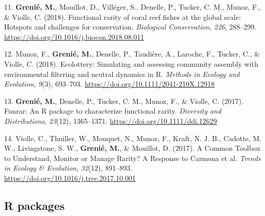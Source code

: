 \documentclass[10pt,a4paper,]{article}
\begin{document}
\leavevmode{}%
11. \textbf{Grenié, M.}, Mouillot, D., Villéger, S., Denelle, P.,
Tucker, C. M., Munoz, F., \& Violle, C. (2018). Functional rarity of
coral reef fishes at the global scale: Hotspots and challenges for
conservation. \emph{Biological Conservation}, \emph{226}, 288--299.
\url{https://doi.org/10.1016/j.biocon.2018.08.011}

\leavevmode{}%
12. Munoz, F., \textbf{Grenié, M.}, Denelle, P., Taudière, A., Laroche,
F., Tucker, C., \& Violle, C. (2018). Ecolottery: Simulating and
assessing community assembly with environmental filtering and neutral
dynamics in R. \emph{Methods in Ecology and Evolution}, \emph{9}(3),
693--703. \url{https://doi.org/10.1111/2041-210X.12918}

\leavevmode{}%
13. \textbf{Grenié, M.}, Denelle, P., Tucker, C. M., Munoz, F., \&
Violle, C. (2017). Funrar: An R package to characterize functional
rarity. \emph{Diversity and Distributions}, \emph{23}(12), 1365--1371.
\url{https://doi.org/10.1111/ddi.12629}

\leavevmode{}%
14. Violle, C., Thuiller, W., Mouquet, N., Munoz, F., Kraft, N. J. B.,
Cadotte, M. W., Livingstone, S. W., \textbf{Grenié, M.}, \& Mouillot, D.
(2017). A Common Toolbox to Understand, Monitor or Manage Rarity? A
Response to Carmona et al. \emph{Trends in Ecology \& Evolution},
\emph{32}(12), 891--893.
\url{https://doi.org/10.1016/j.tree.2017.10.001}

\hypertarget{r-packages}{%
\subsection{R packages}\label{r-packages}}
\end{document}
